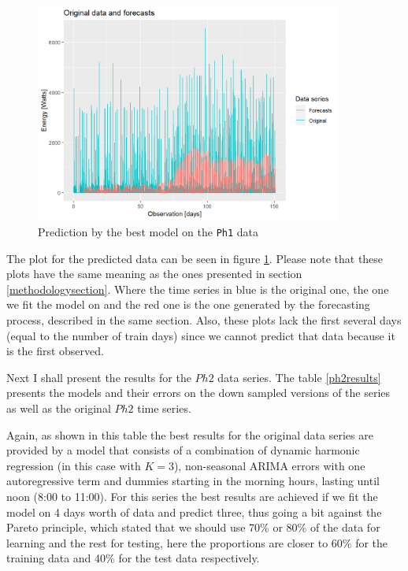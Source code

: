\documentclass[12pt,a4paper,titlepage]{report}
\begin{document}
\begin{figure}[h]
    \centering
    \includegraphics[width=0.9\textwidth]{dbestph1}
    \caption{Prediction by the best model on the \texttt{Ph1} data}
    \label{dbestph1}
\end{figure}

The plot for the predicted data can be seen in figure \ref{dbestph1}. Please note that these plots have the same meaning as the ones presented in section \ref{methodologysection}. Where the time series in blue is the original one, the one we fit the model on and the red one is the one generated by the forecasting process, described in the same section. Also, these plots lack the first several days (equal to the number of train days) since we cannot predict that data because it is the first observed.
    
Next I shall present the results for the $ Ph2 $ data series. The table \ref{ph2results} presents the models and their errors on the down sampled versions of the series as well as the original $ Ph2 $ time series.

Again, as shown in this table the best results for the original data series are provided by a model that consists of a combination of dynamic harmonic regression (in this case with $ K = 3 $), non-seasonal ARIMA errors with one autoregressive term and dummies starting in the morning hours, lasting until noon (8:00 to 11:00). For this series the best results are achieved if we fit the model on 4 days worth of data and predict three, thus going a bit against the Pareto principle, which stated that we should use 70\% or 80\% of the data for learning and the rest for testing, here the proportions are closer to 60\% for the training data and 40\% for the test data respectively.
\end{document}
